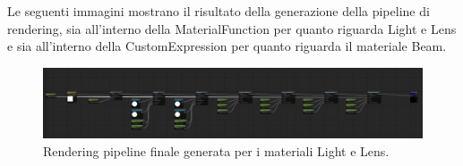 \documentclass[main.tex]{subfiles}
\begin{document}
Le seguenti immagini mostrano il risultato della generazione  della pipeline di rendering, sia all'interno della MaterialFunction per quanto riguarda Light e Lens e sia all'interno della CustomExpression per quanto riguarda il materiale Beam.
\begin{figure}[H]
    \centering
    \includegraphics[width=1\linewidth]{img/newFeatures/renderPipeline.jpg}
    \caption{Rendering pipeline finale generata per i materiali Light e Lens.}
    \label{fig:5_finalRenderingPipeline}
\end{figure}
\end{document}
